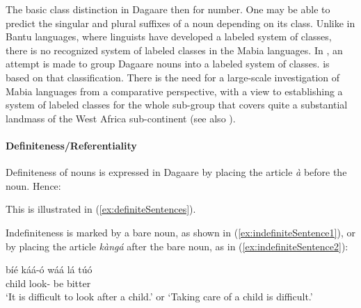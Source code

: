 The basic class distinction in Dagaare then for number. One may be able to predict the
singular and plural suffixes of a noun depending on its class. Unlike in Bantu languages,
where linguists have developed a labeled system of classes, there is no recognized
system of labeled classes in the Mabia languages. In \citet{Bodomo1997}, an attempt is made to group Dagaare nouns into a labeled system of classes.   is
based on that classification. There is the need for a large-scale investigation of Mabia languages from a comparative perspective, with a view to establishing a system of labeled classes for the whole sub-group that covers quite a substantial landmass of the West Africa sub-continent (see also  \citealt{Mieheetal2007}). 

\paragraph{Definiteness/Referentiality}
Definiteness of nouns is expressed in Dagaare by placing the article \textit{à} before the noun. Hence:

\ea {}
\z \z


This is illustrated in (\ref{ex:definiteSentences}).

\ea\label{ex:definiteSentences} 
\z\z 



Indefiniteness is marked by a bare noun, as shown in (\ref{ex:indefiniteSentence1}), or by placing the article \textit{kàngá}
after the bare noun, as in (\ref{ex:indefiniteSentence2}):

\ea\label{ex:indefiniteSentence1}\gll bíé káá-ó wáá lá túó\\
child look-{\NMLZ} be {\FOC} bitter\\
\glt ‘It is difficult to look after a child.’ or
‘Taking care of a child is difficult.’\z 

